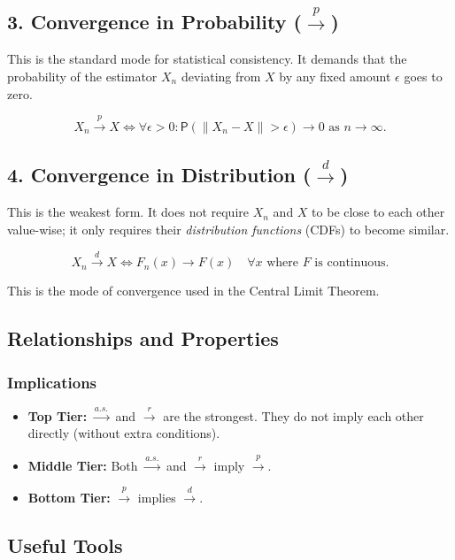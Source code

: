 \subsection*{3. Convergence in Probability ($\xrightarrow{p}$)}
This is the standard mode for statistical consistency. It demands that the probability of the estimator $X_n$ deviating from $X$ by any fixed amount $\epsilon$ goes to zero.

\[ X_n \xrightarrow{p} X \iff \forall \epsilon > 0 : \mathsf{P}(\|X_n - X\| > \epsilon) \to 0 \text{ as } n \to \infty. \]

\subsection*{4. Convergence in Distribution ($\xrightarrow{d}$)}
This is the weakest form. It does not require $X_n$ and $X$ to be close to each other value-wise; it only requires their \textit{distribution functions} (CDFs) to become similar.

\[ X_n \xrightarrow{d} X \iff F_n(x) \to F(x) \quad \forall x \text{ where } F \text{ is continuous.} \]
\begin{note}[]
This is the mode of convergence used in the Central Limit Theorem.
\end{note}

\subsection*{Relationships and Properties}

\subsubsection{Implications}
\begin{itemize}
    \item \textbf{Top Tier:} $\xrightarrow{a.s.}$ and $\xrightarrow{r}$ are the strongest. They do not imply each other directly (without extra conditions).
    \item \textbf{Middle Tier:} Both $\xrightarrow{a.s.}$ and $\xrightarrow{r}$ imply $\xrightarrow{p}$.
    \item \textbf{Bottom Tier:} $\xrightarrow{p}$ implies $\xrightarrow{d}$.
\end{itemize}

\subsection*{Useful Tools}

